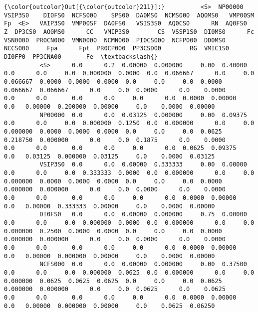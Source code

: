 \documentclass[11pt]{article}
\begin{document}
\begin{Verbatim}[commandchars=\\\{\}]
{\color{outcolor}Out[{\color{outcolor}211}]:}          <S>  NP00000  VSIP3S0    DI0FS0  NCFS000    SPS00  DA0MS0  NCMS000  AQ0MS0   VMP00SM      Fp  <E>   VAIP3S0  VMP00SF  DA0FS0   VSIS3S0  AQ0CS0      RN  AQ0FS0    Z  DP3CS0  AO0MS0      CC   VMIP3S0        CS  VSSP1S0  DI0MS0      Fc  VSN0000  PR0CN000  VMN0000  NCMN000  PI0CS000  NCFP000  DD0MS0  NCCS000     Fpa      Fpt  PR0CP000  PP3CSD00        RG  VMIC1S0  DI0FP0  PP3CNA00       Fe  \textbackslash{}
          <S>      0.0      0.2  0.00000  0.000000     0.00  0.40000     0.0      0.0     0.0  0.000000  0.0000  0.0  0.066667      0.0     0.0  0.066667  0.0000  0.0000  0.0000  0.0     0.0     0.0  0.0000  0.066667  0.066667      0.0     0.0  0.0000      0.0    0.0000      0.0      0.0       0.0      0.0     0.0      0.0  0.0000  0.00000       0.0   0.00000  0.200000  0.00000     0.0    0.0000  0.00000   
          NP00000  0.0      0.0  0.03125  0.000000     0.00  0.09375     0.0      0.0     0.0  0.000000  0.1250  0.0  0.000000      0.0     0.0  0.000000  0.0000  0.0000  0.0000  0.0     0.0     0.0  0.0625  0.218750  0.000000      0.0     0.0  0.1875      0.0    0.0000      0.0      0.0       0.0      0.0     0.0      0.0  0.0625  0.09375       0.0   0.03125  0.000000  0.03125     0.0    0.0000  0.03125   
          VSIP3S0  0.0      0.0  0.00000  0.333333     0.00  0.00000     0.0      0.0     0.0  0.333333  0.0000  0.0  0.000000      0.0     0.0  0.000000  0.0000  0.0000  0.0000  0.0     0.0     0.0  0.0000  0.000000  0.000000      0.0     0.0  0.0000      0.0    0.0000      0.0      0.0       0.0      0.0     0.0      0.0  0.0000  0.00000       0.0   0.00000  0.333333  0.00000     0.0    0.0000  0.00000   
          DI0FS0   0.0      0.0  0.00000  0.000000     0.75  0.00000     0.0      0.0     0.0  0.000000  0.0000  0.0  0.000000      0.0     0.0  0.000000  0.2500  0.0000  0.0000  0.0     0.0     0.0  0.0000  0.000000  0.000000      0.0     0.0  0.0000      0.0    0.0000      0.0      0.0       0.0      0.0     0.0      0.0  0.0000  0.00000       0.0   0.00000  0.000000  0.00000     0.0    0.0000  0.00000   
          NCFS000  0.0      0.0  0.00000  0.000000     0.00  0.37500     0.0      0.0     0.0  0.000000  0.0625  0.0  0.000000      0.0     0.0  0.000000  0.0625  0.0625  0.0625  0.0     0.0     0.0  0.0625  0.000000  0.000000      0.0     0.0  0.0625      0.0    0.0625      0.0      0.0       0.0      0.0     0.0      0.0  0.0000  0.00000       0.0   0.00000  0.000000  0.00000     0.0    0.0625  0.06250   
          

\end{Verbatim}
\end{document}
